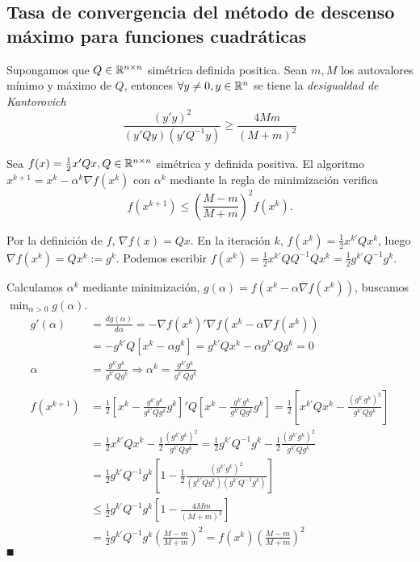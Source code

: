 \documentclass[MIOP.tex]{subfiles}
\begin{document}
\subsection{Tasa de convergencia del método de descenso máximo para funciones cuadráticas}
Supongamos que $Q\in\mathbb{R}^{n\times n}$ simétrica definida positica. Sean $m,M$ los autovalores mínimo y máximo de $Q$, entonces $\forall y\neq 0, y\in\mathbb{R}^n$ se tiene la \emph{desigualdad de Kantorovich}
$$\frac{(y'y)^2}{(y'Qy)(y'Q^{-1}y)}\geq\frac{4Mm}{(M+m)^2}$$

\begin{teorema}
Sea $f(x)=\frac{1}{2}x'Qx, Q\in\mathbb{R}^{n\times n}$ simétrica y definida positiva. El algoritmo $x^{k+1}=x^k-\alpha^k\nabla f(x^k)$ con $\alpha^k$ mediante la regla de minimización verifica
$$f(x^{k+1})\leq \left(\frac{M-m}{M+m}\right)^2f(x^k).$$
\end{teorema}
\begin{dem}
Por la definición de $f$, $\nabla f(x)=Qx$. En la iteración $k$, $f(x^k)=\frac{1}{2}x^{k'}Qx^k$, luego $\nabla f(x^k)=Qx^k:=g^k$. Podemos escribir $f(x^k)=\frac{1}{2}x^{k'}QQ^{-1}Qx^k=\frac{1}{2}g^{k'}Q^{-1}g^k$. 

Calculamos $\alpha^k$ mediante minimización, $g(\alpha)=f(x^k-\alpha\nabla f(x^k))$, buscamos $\min_{\alpha>0}g(\alpha)$. 
\begin{align*}
g'(\alpha)&=\frac{dg(\alpha)}{d\alpha}=-\nabla f(x^k)'\nabla f(x^k-\alpha\nabla f(x^k))\\
&=-g^{k'}Q[x^k-\alpha g^k]=g^{k'}Qx^k-\alpha g^{k'}Qg^k=0\\
\alpha&=\frac{g^{k'}g^k}{g^{k'}Qg^k}\Rightarrow \alpha^k=\frac{g^{k'}g^k}{g^{k'}Qg^k}
\\ \\
f(x^{k+1})&=\frac{1}{2}\left[x^k-\frac{g^{k'}g^k}{g^{k'}Qg^k}g^k\right]'Q\left[x^k-\frac{g^{k'}g^k}{g^{k'}Qg^k}g^k\right]=\frac{1}{2}\left[x^{k'}Qx^k-\frac{(g^{k'}g^k)^2}{g^{k'}Qg^k}\right]\\
&=\frac{1}{2}x^{k'}Qx^k-\frac{1}{2}\frac{(g^{k'}g^k)^2}{g^{k'}Qg^k}=\frac{1}{2}g^{k'}Q^{-1}g^k-\frac{1}{2}\frac{(g^{k'}g^k)^2}{g^{k'}Qg^k}\\ 
&=\frac{1}{2}g^{k'}Q^{-1}g^k\left[1-\frac{1}{2}\frac{(g^{k'}g^k)^2}{(g^{k'}Qg^k)(g^{k'}Q^{-1}g^k)}\right]\\
&\leq\frac{1}{2}g^{k'}Q^{-1}g^k\left[1-\frac{4Mm}{(M+m)^2}\right]\\
&=\frac{1}{2}g^{k'}Q^{-1}g^k\left(\frac{M-m}{M+m}\right)^2=f(x^k)\left(\frac{M-m}{M+m}\right)^2
\end{align*}
$\QED$
\end{dem}
\end{document}
